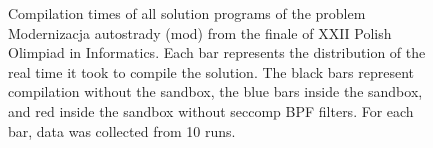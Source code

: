 \documentclass[en]{pracamgr}
\begin{document}
\begin{appendices}
\begin{figure}[H]
\caption{Compilation times of all solution programs of the problem Modernizacja autostrady (mod) from the finale of XXII Polish Olimpiad in Informatics. Each bar represents the distribution of the real time it took to compile the solution. The black bars represent compilation without the sandbox, the blue bars inside the sandbox, and red inside the sandbox without seccomp BPF filters. For each bar, data was collected from 10 runs.}
\label{figure:mod_compilation_real_time}
\end{figure}


\end{appendices}
\end{document}

